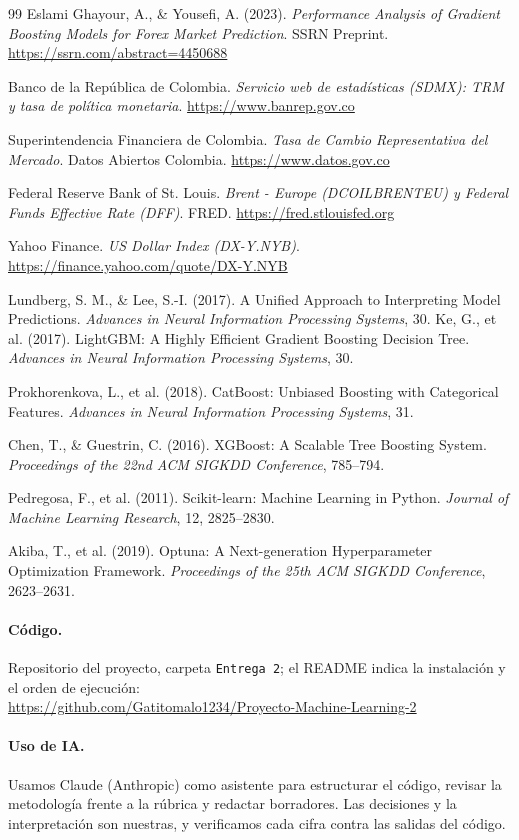 \documentclass[11pt,letterpaper]{article}
\begin{document}
\clearpage
\begin{thebibliography}{99}
\small
{}
Eslami Ghayour, A., \& Yousefi, A. (2023). \textit{Performance Analysis of Gradient Boosting Models for Forex Market Prediction}. SSRN Preprint. \url{https://ssrn.com/abstract=4450688}

Banco de la República de Colombia. \textit{Servicio web de estadísticas (SDMX): TRM y tasa de política monetaria}. \url{https://www.banrep.gov.co}

Superintendencia Financiera de Colombia. \textit{Tasa de Cambio Representativa del Mercado}. Datos Abiertos Colombia. \url{https://www.datos.gov.co}

Federal Reserve Bank of St. Louis. \textit{Brent - Europe (DCOILBRENTEU) y Federal Funds Effective Rate (DFF)}. FRED. \url{https://fred.stlouisfed.org}

Yahoo Finance. \textit{US Dollar Index (DX-Y.NYB)}. \url{https://finance.yahoo.com/quote/DX-Y.NYB}

Lundberg, S. M., \& Lee, S.-I. (2017). A Unified Approach to Interpreting Model Predictions. \textit{Advances in Neural Information Processing Systems}, 30.
Ke, G., et al. (2017). LightGBM: A Highly Efficient Gradient Boosting Decision Tree. \textit{Advances in Neural Information Processing Systems}, 30.

Prokhorenkova, L., et al. (2018). CatBoost: Unbiased Boosting with Categorical Features. \textit{Advances in Neural Information Processing Systems}, 31.

Chen, T., \& Guestrin, C. (2016). XGBoost: A Scalable Tree Boosting System. \textit{Proceedings of the 22nd ACM SIGKDD Conference}, 785--794.

Pedregosa, F., et al. (2011). Scikit-learn: Machine Learning in Python. \textit{Journal of Machine Learning Research}, 12, 2825--2830.

Akiba, T., et al. (2019). Optuna: A Next-generation Hyperparameter Optimization Framework. \textit{Proceedings of the 25th ACM SIGKDD Conference}, 2623--2631.
\end{thebibliography}

\paragraph{Código.} Repositorio del proyecto, carpeta \texttt{Entrega 2}; el README indica la instalación y el orden de ejecución:\\
\url{https://github.com/Gatitomalo1234/Proyecto-Machine-Learning-2}

\paragraph{Uso de IA.} Usamos Claude (Anthropic) como asistente para estructurar el código, revisar la metodología frente a la rúbrica y redactar borradores. Las decisiones y la interpretación son nuestras, y verificamos cada cifra contra las salidas del código.
\end{document}
